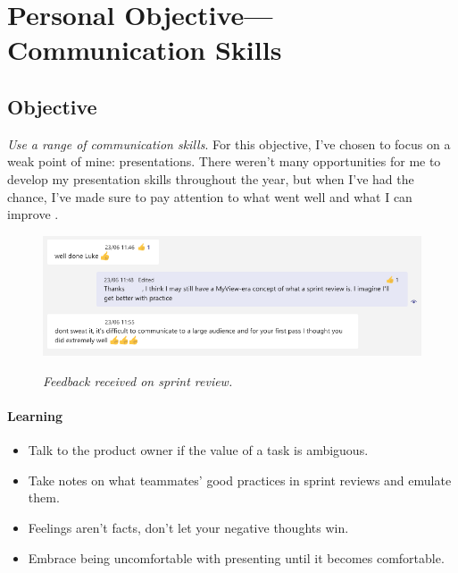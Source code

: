 \section{Personal Objective---Communication Skills}
\subsection{Objective}
\emph{Use a range of communication skills}. 
For this objective, I've chosen to focus on a weak point of mine: presentations. There weren't many opportunities for me to develop my presentation skills throughout the year, but when I've had the chance, I've made sure to pay attention to what went well and what I can improve \parencite[][p. 5, entry 23/04/2021]{scanlan_2021}.

\begin{figure}[ht]
    \caption{\small{\emph{Feedback received on sprint review.}}}
    \includegraphics[width=\textwidth]{images/sprint review feedback.png}
    \label{fig:revfeedback}
\end{figure}

\paragraph{Learning}
\begin{itemize}
    \item Talk to the product owner if the value of a task is ambiguous.
    \item Take notes on what teammates' good practices in sprint reviews and emulate them.
    \item Feelings aren't facts, don't let your negative thoughts win.
    \item Embrace being uncomfortable with presenting until it becomes comfortable.
\end{itemize}
